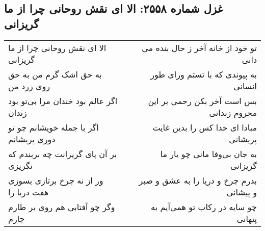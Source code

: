 \begin{center}
\section*{غزل شماره ۲۵۵۸: الا ای نقش روحانی چرا از ما گریزانی}
\label{sec:2558}
\begin{longtable}{l p{0.5cm} r}
الا ای نقش روحانی چرا از ما گریزانی
&&
تو خود از خانه آخر ز حال بنده می دانی
\\
به حق اشک گرم من به حق روی زرد من
&&
به پیوندی که با تستم ورای طور انسانی
\\
اگر عالم بود خندان مرا بی‌تو بود زندان
&&
بس است آخر بکن رحمی بر این محروم زندانی
\\
اگر با جمله خویشانم چو تو دوری پریشانم
&&
مبادا ای خدا کس را بدین غایت پریشانی
\\
بر آن پای گریزانت چه بربندم که نگریزی
&&
به جان بی‌وفا مانی چو یار ما گریزانی
\\
ور از نه چرخ برتازی بسوزی هفت دریا را
&&
بدرم چرخ و دریا را به عشق و صبر و پیشانی
\\
وگر چو آفتابی هم روی بر طارم چارم
&&
چو سایه در رکاب تو همی‌آیم به پنهانی
\\
\end{longtable}
\end{center}
